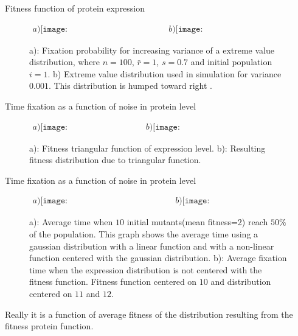   Fitness function of protein expression
\begin{figure}[H]
\begin{center}$
\begin{array}{cc}
a)\texttt{[image: exremeValueFixation.pdf]} &
b)\texttt{[image: histextremevalue.pdf]}
\end{array}$
\end{center}
\caption{a): Fixation probability for increasing variance of a extreme value distribution, where $n=100$, $\bar{r}=1$, $s=0.7$ and initial population $i=1$. b) Extreme value distribution used in simulation for variance $0.001$. This distribution is humped toward right .}
\label{Fig7.2}
\end{figure}
Time fixation as a function of noise in protein level

  
\begin{figure}[H]
\begin{center}$
\begin{array}{cc}
a)\texttt{[image: TriangularFunction.jpg]} &
b)\texttt{[image: triangularfunctionHistogram.pdf]}
\end{array}$
\end{center}
\caption{a): Fitness triangular function of expression level. b): Resulting fitness distribution due to triangular function.}
\label{Fig7.2}
\end{figure}
Time fixation as a function of noise in protein level

  \begin{figure}[H]
\begin{center}$
\begin{array}{cc}
a) \texttt{[image: SigmaVariationLTfitness.pdf]} &
b)\texttt{[image: nocenteredVsSigma.pdf]}
\end{array}$
\end{center}
\caption{a): Average time when $10$ initial mutants(mean fitness=2) reach  $50\%$ of the population. This graph shows the average  time using a gaussian distribution with a linear function and with a non-linear function centered with the gaussian distribution. b): Average fixation time when the expression distribution is not centered with the fitness function. Fitness function centered on $10$ and distribution centered on $11$ and $12$.}
\label{Fig7.3}
\end{figure}
Really it is a function of average fitness of the distribution resulting from the fitness protein function.

